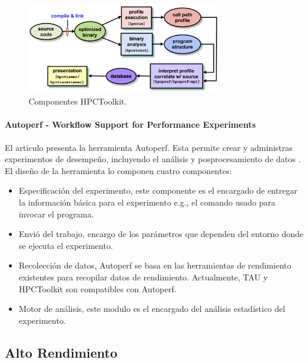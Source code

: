 \begin{figure}[H]
    \centering
    \includegraphics[width=0.75\textwidth]{imagenes/image14.png}
    \caption{Componentes HPCToolkit.}
    \label{fig:hpctoolkit}
\end{figure}



\paragraph{Autoperf - Workflow Support for Performance Experiments}
El articulo presenta la herramienta Autoperf. Esta permite crear y administras experimentos de desempeño, incluyendo el análisis y posprocesamiento de datos
\cite{Dai2015}.
El diseño de la herramienta lo componen cuatro componentes:
\begin{itemize}
  \item Especificación del experimento, este componente es el encargado de entregar la información básica para el experimento e.g., el comando usado para invocar el programa.
  \item Envió del trabajo, encargo de los parámetros que dependen del entorno donde se ejecuta el experimento.
  \item Recolección de datos, Autoperf se basa en las herramientas de rendimiento existentes para recopilar datos de rendimiento.
  Actualmente, TAU y HPCToolkit son compatibles con Autoperf.
  \item Motor de análisis, este modulo es el encargado del análisis estadístico del experimento.
\end{itemize}

\subsection{Alto Rendimiento}


